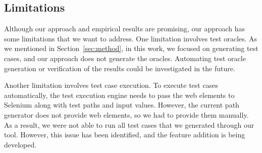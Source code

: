 \subsection{Limitations}
\label{sec:limitations}

Although our approach and empirical results are promising,
our approach has some limitations that we want to address. 
One limitation involves test oracles. As we mentioned
in Section~\ref{sec:method}, in this work, we focused
on generating test cases, and our approach does not generate
the oracles. Automating test oracle generation or verification 
of the results could be investigated in the future. 
 
Another limitation involves test case execution.
To execute test cases automatically, the test execution engine 
needs to pass the web elements to Selenium along with test paths and
input values. However, the current path generator does not 
provide web elements, so we had to provide them manually.
As a result, we were not able to run all test cases that 
we generated through our tool. However, this issue has been identified,
and the feature addition is being developed. 
 
